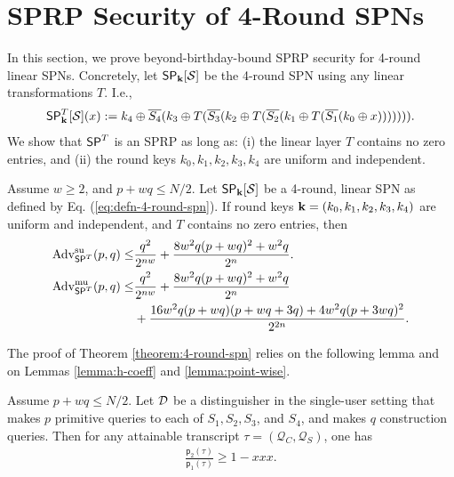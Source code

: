 
\section{SPRP Security of 4-Round SPNs}
\label{section:security of 4-round SPNs}

In this section, we prove beyond-birthday-bound SPRP security for 4-round linear SPNs. Concretely, let $\mathsf{SP}_{\mathbf{k}}[\mathcal{S}]$ be the 4-round SPN using any linear transformations $T$. I.e.,
%
\begin{align}
\mathsf{SP}_{\mathbf{k}}^T[\mathcal{S}](x):=k_4\oplus\overline{S_4}(k_3\oplus T(\overline{S_3}(k_2\oplus T(\overline{S_2}(k_1\oplus T(\overline{S_1}(k_0\oplus x))))))).
\label{eq:defn-4-round-spn}
\end{align}
%
We show that $\mathsf{SP}^T$ is an SPRP as long as: (i) the linear layer $T$ contains no zero entries,
and (ii) the round keys $k_0,k_1,k_2,k_3,k_4$ are uniform and independent.


\begin{theorem}
\label{theorem:4-round-spn}

Assume $w\geq2$, and $p+wq\leq N/2$. Let $\mathsf{SP}_{\mathbf{k}}[\mathcal{S}]$ be a 4-round, linear SPN as defined by Eq. (\ref{eq:defn-4-round-spn}). If round keys $\mathbf{k}=(k_0,k_1,k_2,k_3,k_4)$ are uniform and independent, and $T$ contains no zero entries, then
%
\begin{align}
\operatorname{Adv}_{\mathsf{SP}^T}^{\mathrm{su}}(p, q) \leq& \frac{q^2}{2^{n w}} + \frac{8 w^2 q(p+wq)^2+w^2 q}{2^n}   .  
\notag   \\
\operatorname{Adv}_{\mathsf{SP}^T}^{\mathrm{mu}}(p, q) \leq& \frac{q^2}{2^{n w}} + \frac{8 w^2 q(p+wq)^2+w^2 q}{2^n}    \notag   \\
&+ \frac{16 w^2 q(p+w q)(p+w q +3 q)+4 w^2 q(p+3 wq)^2}{2^{2 n}}.
\notag
\end{align}
\end{theorem}
The proof of Theorem \ref{theorem:4-round-spn} relies on the following lemma and on Lemmas \ref{lemma:h-coeff} and \ref{lemma:point-wise}.


\begin{lemma}
	\label{lemma:proximity-4-round}
	
	Assume $p+wq\leq N/2$. Let $\mathcal{D}$ be a distinguisher in the single-user setting that makes $p$ primitive queries to each of $S_1,S_2,S_3$, and $S_4$, and makes $q$ construction queries. Then for any attainable
	transcript $\tau=(\mathcal{Q}_C,\mathcal{Q}_S)$, one has
	\begin{align}
	\frac{\mathsf{p}_{2}(\tau)}{\mathsf{p}_{1}(\tau)}
	\geq 1 - xxx.
	\label{eq:bound-proximity-4-round}
	\end{align}
\end{lemma}




